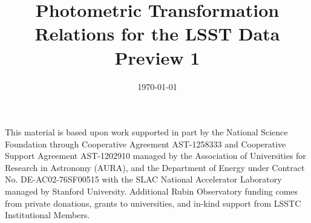 \documentclass[modern]{aastex7}
\begin{document}

\date{\today}
\title{Photometric Transformation Relations for the LSST Data Preview 1}




\keywords{}





\begin{acknowledgments}
This material is based upon work supported in part by the National Science Foundation through Cooperative Agreement AST-1258333 and Cooperative Support Agreement AST-1202910 managed by the Association of Universities for Research in Astronomy (AURA), and the Department of Energy under Contract No. DE-AC02-76SF00515 with the SLAC National Accelerator Laboratory managed by Stanford University.
Additional Rubin Observatory funding comes from private donations, grants to universities, and in-kind support from LSSTC Institutional Members.
\end{acknowledgments}
\end{document}
